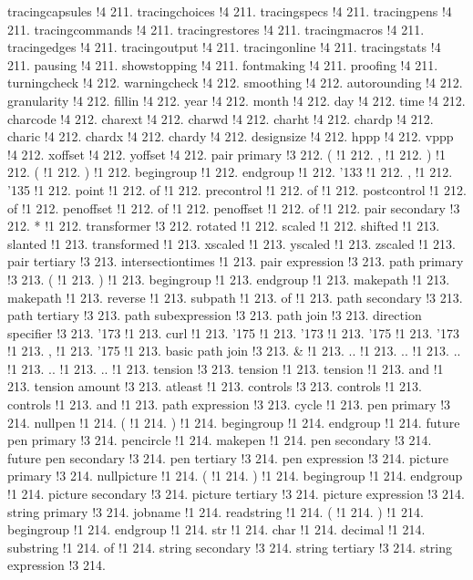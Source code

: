 tracingcapsules !4 211.
tracingchoices !4 211.
tracingspecs !4 211.
tracingpens !4 211.
tracingcommands !4 211.
tracingrestores !4 211.
tracingmacros !4 211.
tracingedges !4 211.
tracingoutput !4 211.
tracingonline !4 211.
tracingstats !4 211.
pausing !4 211.
showstopping !4 211.
fontmaking !4 211.
proofing !4 211.
turningcheck !4 212.
warningcheck !4 212.
smoothing !4 212.
autorounding !4 212.
granularity !4 212.
fillin !4 212.
year !4 212.
month !4 212.
day !4 212.
time !4 212.
charcode !4 212.
charext !4 212.
charwd !4 212.
charht !4 212.
chardp !4 212.
charic !4 212.
chardx !4 212.
chardy !4 212.
designsize !4 212.
hppp !4 212.
vppp !4 212.
xoffset !4 212.
yoffset !4 212.
pair primary !3 212.
( !1 212.
, !1 212.
) !1 212.
( !1 212.
) !1 212.
begingroup !1 212.
endgroup !1 212.
\char '133 !1 212.
, !1 212.
\char '135 !1 212.
point !1 212.
of !1 212.
precontrol !1 212.
of !1 212.
postcontrol !1 212.
of !1 212.
penoffset !1 212.
of !1 212.
penoffset !1 212.
of !1 212.
pair secondary !3 212.
* !1 212.
transformer !3 212.
rotated !1 212.
scaled !1 212.
shifted !1 213.
slanted !1 213.
transformed !1 213.
xscaled !1 213.
yscaled !1 213.
zscaled !1 213.
pair tertiary !3 213.
intersectiontimes !1 213.
pair expression !3 213.
path primary !3 213.
( !1 213.
) !1 213.
begingroup !1 213.
endgroup !1 213.
makepath !1 213.
makepath !1 213.
reverse !1 213.
subpath !1 213.
of !1 213.
path secondary !3 213.
path tertiary !3 213.
path subexpression !3 213.
path join !3 213.
direction specifier !3 213.
\char '173 !1 213.
curl !1 213.
\char '175 !1 213.
\char '173 !1 213.
\char '175 !1 213.
\char '173 !1 213.
, !1 213.
\char '175 !1 213.
basic path join !3 213.
\& !1 213.
.. !1 213.
.. !1 213.
.. !1 213.
.. !1 213.
.. !1 213.
tension !3 213.
tension !1 213.
tension !1 213.
and !1 213.
tension amount !3 213.
atleast !1 213.
controls !3 213.
controls !1 213.
controls !1 213.
and !1 213.
path expression !3 213.
cycle !1 213.
pen primary !3 214.
nullpen !1 214.
( !1 214.
) !1 214.
begingroup !1 214.
endgroup !1 214.
future pen primary !3 214.
pencircle !1 214.
makepen !1 214.
pen secondary !3 214.
future pen secondary !3 214.
pen tertiary !3 214.
pen expression !3 214.
picture primary !3 214.
nullpicture !1 214.
( !1 214.
) !1 214.
begingroup !1 214.
endgroup !1 214.
picture secondary !3 214.
picture tertiary !3 214.
picture expression !3 214.
string primary !3 214.
jobname !1 214.
readstring !1 214.
( !1 214.
) !1 214.
begingroup !1 214.
endgroup !1 214.
str !1 214.
char !1 214.
decimal !1 214.
substring !1 214.
of !1 214.
string secondary !3 214.
string tertiary !3 214.
string expression !3 214.
